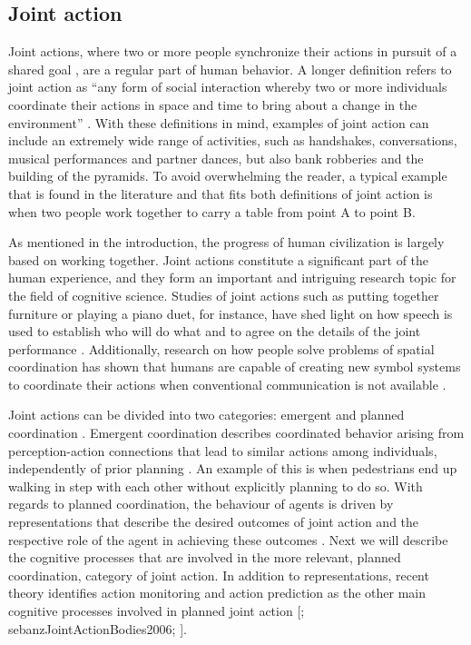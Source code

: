 \documentclass[10pt,a4paper,onecolumn]{article}
\begin{document}
\hypertarget{joint-action}{%
\subsection{Joint action}\label{joint-action}}

Joint actions, where two or more people synchronize their actions in pursuit of a shared goal \autocite{knoblichPsychologicalResearchJoint2011}, are a regular part of human behavior. A longer definition refers to joint action as ``any form of social interaction whereby two or more individuals coordinate their actions in space and time to bring about a change in the environment'' \autocite[p.~1]{sebanzJointActionBodies2006}. With these definitions in mind, examples of joint action can include an extremely wide range of activities, such as handshakes, conversations, musical performances and partner dances, but also bank robberies and the building of the pyramids. To avoid overwhelming the reader, a typical example that is found in the literature \autocite{sebanzJointActionBodies2006} and that fits both definitions of joint action is when two people work together to carry a table from point A to point B.

As mentioned in the introduction, the progress of human civilization is largely based on working together. Joint actions constitute a significant part of the human experience, and they form an important and intriguing research topic for the field of cognitive science. Studies of joint actions such as putting together furniture or playing a piano duet, for instance, have shed light on how speech is used to establish who will do what and to agree on the details of the joint performance \autocite{clarkCoordinatingEachOther2005}. Additionally, research on how people solve problems of spatial coordination has shown that humans are capable of creating new symbol systems to coordinate their actions when conventional communication is not available \autocite{galantucciExperimentalSemioticsNew2009}.

Joint actions can be divided into two categories: emergent and planned coordination \autocite{knoblichPsychologicalResearchJoint2011}. Emergent coordination describes coordinated behavior arising from perception-action connections that lead to similar actions among individuals, independently of prior planning \autocite{knoblichPsychologicalResearchJoint2011}. An example of this is when pedestrians end up walking in step with each other without explicitly planning to do so. With regards to planned coordination, the behaviour of agents is driven by representations that describe the desired outcomes of joint action and the respective role of the agent in achieving these outcomes \autocite{knoblichPsychologicalResearchJoint2011}. Next we will describe the cognitive processes that are involved in the more relevant, planned coordination, category of joint action. In addition to representations, recent theory identifies action monitoring and action prediction as the other main cognitive processes involved in planned joint action {[}\textcite{loehrMonitoringIndividualJoint2013}; sebanzJointActionBodies2006; \textcite{vesperMinimalArchitectureJoint2010}{]}.
\end{document}
